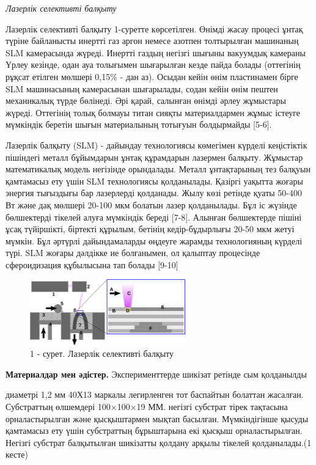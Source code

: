 \begin{multicols}{2}
\emph{Лазерлік селективті балқыту}

Лазерлік селективті балқыту 1-суретте көрсетілген. Өнімді жасау процесі
ұнтақ түріне байланысты инертті газ аргон немесе азотпен толтырылған
машинаның SLM камерасында жүреді. Инертті газдың негізгі шығыны
вакуумдық камераны Үрлеу кезінде, одан ауа толығымен шығарылған кезде
пайда болады (оттегінің рұқсат етілген мөлшері 0,15\% - дан аз). Осыдан
кейін өнім пластинамен бірге SLM машинасының камерасынан шығарылады,
содан кейін өнім пештен механикалық түрде бөлінеді. Әрі қарай, салынған
өнімді әрлеу жұмыстары жүреді. Оттегінің толық болмауы титан сияқты
материалдармен жұмыс істеуге мүмкіндік беретін шығын материалының
тотығуын болдырмайды {[}5-6{]}.

Лазерлік балқыту (SLM) - дайындау технологиясы көмегімен күрделі
кеңістіктік пішіндегі металл бұйымдарын ұнтақ құрамдарын лазермен
балқыту. Жұмыстар математикалық модель негізінде орындалады. Металл
ұнтақтарының тез балқуын қамтамасыз ету үшін SLM технологиясы
қолданылады. Қазіргі уақытта жоғары энергия тығыздығы бар лазерлерді
қолданады. Жылу көзі ретінде қуаты 50-400 Вт және дақ мөлшері 20-100 мкм
болатын лазер қолданылады. Бұл іс жүзінде бөлшектерді тікелей алуға
мүмкіндік береді {[}7-8{]}. Алынған бөлшектерде пішіні ұсақ түйіршікті,
біртекті құрылым, бетінің кедір-бұдырлығы 20-50 мкм жетуі мүмкін. Бұл
әртүрлі дайындамаларды өңдеуге жарамды технологияның күрделі түрі. SLM
жоғары дәлдікке ие болғанымен, ол қалыптау процесінде сфероидизация
құбылысына тап болады {[}9-10{]}
\end{multicols}

\begin{figure}[H]
	\centering
	\includegraphics[width=0.6\textwidth]{media/ict2/image187}
	\caption*{1 - сурет. Лазерлік селективті балқыту}
\end{figure}

\begin{multicols}{2}
{\bfseries Материалдар мен әдістер.} Эксперименттерде шикізат ретінде сым
қолданылды

диаметрі 1,2 мм 40Х13 маркалы легирленген тот баспайтын болаттан
жасалған. Субстраттың өлшемдері 100×100×19 ММ. негізгі субстрат тірек
тақтасына орналастырылған және қысқыштармен мықтап басылған.
Мүмкіндігінше қысуды қамтамасыз ету үшін субстраттың бұрыштарына екі
қысқыш орналастырылған. Негізгі субстрат балқытылған шикізатты қолдану
арқылы тікелей қолданылады.(1 кесте)
\end{multicols}

